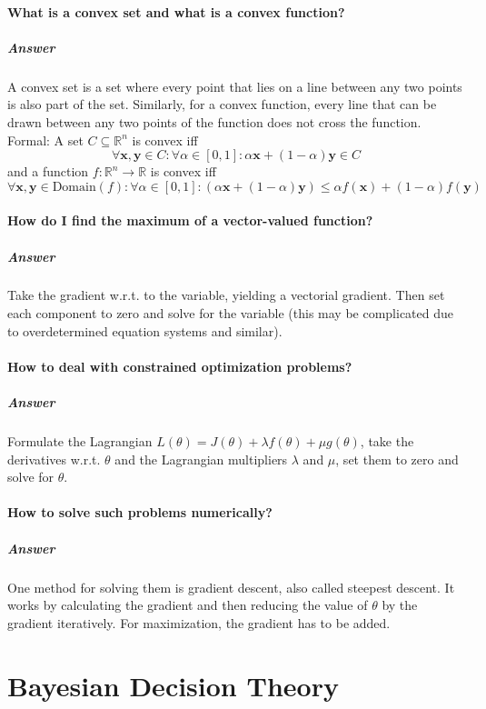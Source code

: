 \documentclass[a4paper, 11pt, accentcolor = tud3b]{tudreport}
\newcommand{\answer}[1]{\subparagraph{Answer} #1}
\newcommand{\R}{\ensuremath{\mathbb{R}}}
\renewcommand{\vec}[1]{\mathbf{#1}}
\begin{document}
			\paragraph{What is a convex set and what is a convex function?}
			\answer{A convex set is a set where every point that lies on a line between any two points is also part of the set. Similarly, for a convex function, every line that can be drawn between any two points of the function does not cross the function. Formal: A set \( C \subseteq \R^n \) is convex iff \[ \forall \vec{x}, \vec{y} \in C : \forall \alpha \in [0, 1] : \alpha\vec{x} + (1 - \alpha)\vec{y} \in C \] and a function \( f : \R^n \to \R \) is convex iff \[ \forall \vec{x}, \vec{y} \in \textrm{Domain}(f) : \forall \alpha \in [0, 1] : (\alpha\vec{x} + (1 - \alpha)\vec{y}) \leq \alpha f(\vec{x}) + (1 - \alpha) f(\vec{y}) \]}

			\paragraph{How do I find the maximum of a vector-valued function?}
			\answer{Take the gradient w.r.t. to the variable, yielding a vectorial gradient. Then set each component to zero and solve for the variable (this may be complicated due to overdetermined equation systems and similar).}

			\paragraph{How to deal with constrained optimization problems?}
			\answer{Formulate the Lagrangian \( L(\theta) = J(\theta) + \lambda f(\theta) + \mu g(\theta) \), take the derivatives w.r.t. \(\theta\) and the Lagrangian multipliers \(\lambda\) and \(\mu\), set them to zero and solve for \(\theta\).}

			\paragraph{How to solve such problems numerically?}
			\answer{One method for solving them is gradient descent, also called steepest descent. It works by calculating the gradient and then reducing the value of \(\theta\) by the gradient iteratively. For maximization, the gradient has to be added.}

		\section{Bayesian Decision Theory}
\end{document}
